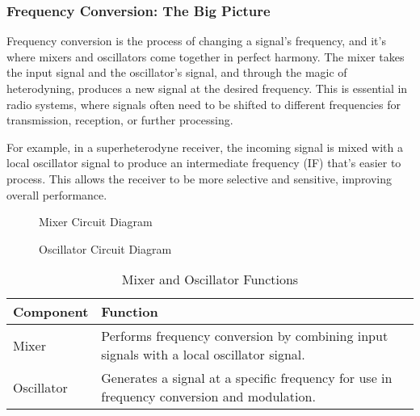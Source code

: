 \subsubsection*{Frequency Conversion: The Big Picture}

Frequency conversion is the process of changing a signal's frequency, and it's where mixers and oscillators come together in perfect harmony. The mixer takes the input signal and the oscillator's signal, and through the magic of heterodyning, produces a new signal at the desired frequency. This is essential in radio systems, where signals often need to be shifted to different frequencies for transmission, reception, or further processing.

For example, in a superheterodyne receiver, the incoming signal is mixed with a local oscillator signal to produce an intermediate frequency (IF) that's easier to process. This allows the receiver to be more selective and sensitive, improving overall performance.

\begin{figure}[h!]
    \centering
    \caption{Mixer Circuit Diagram}
    \label{fig:mixer-diagram}
\end{figure}

\begin{figure}[h!]
    \centering
    \caption{Oscillator Circuit Diagram}
    \label{fig:oscillator-diagram}
\end{figure}

\begin{table}[h!]
    \centering
    \begin{tabular}{|l|l|}
        \hline
        \textbf{Component} & \textbf{Function} \\
        \hline
        Mixer & Performs frequency conversion by combining input signals with a local oscillator signal. \\
        Oscillator & Generates a signal at a specific frequency for use in frequency conversion and modulation. \\
        \hline
    \end{tabular}
    \caption{Mixer and Oscillator Functions}
    \label{tab:mixer-oscillator}
\end{table}

